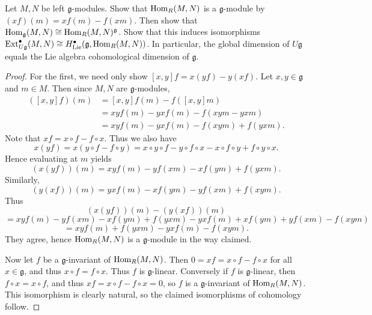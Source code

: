 \begin{exercise}\label{7.3.7}
	Let $M,N$ be left $\mathfrak{g} $-modules. Show that $\operatorname{Hom}_R(M,N)$ is a $\mathfrak{g} $-module by $(xf)(m)=xf(m)-f(xm)$. Then show that $\operatorname{Hom}_\mathfrak{g}(M,N)\cong \operatorname{Hom} _R (M,N)^\mathfrak{g} $.  Show that this induces isomorphisms $\operatorname{Ext} ^{\bullet} _{U\mathfrak{g} } (M,N)\cong H^{\bullet} _{\mathrm{Lie} } (\mathfrak{g} ,\operatorname{Hom}_R(M,N))$. In particular, the global dimension of $U\mathfrak{g} $ equals the Lie algebra cohomological dimension of $\mathfrak{g} $.
\end{exercise}
\begin{proof}
	For the first, we need only show $[x,y]f=x(yf)-y(xf)$. Let $x,y\in \mathfrak{g} $ and $m\in M$. Then since $M,N$ are $\mathfrak{g} $-modules, 
	\begin{align*}
		([x,y]f)(m) &= [x,y]f(m) - f([x,y]m)\\
			    &=xyf(m) - yxf(m) - f(xym - yxm)\\
			    &=xyf(m) - yxf(m) - f(xym) + f(yxm)
	.\end{align*}
	Note that $xf = x\circ f-f\circ x$. Thus we also have
	\[
		x(yf) = x(y\circ f - f\circ y) = x\circ y\circ f - y\circ f\circ x - x \circ f\circ y + f\circ y\circ x
	.\]
	Hence evaluating at $m$ yields
	\[
		(x(yf))(m) = xyf(m) - yf(xm) - xf(ym) + f(yxm)
	.\]
	Similarly,
	\[
		(y(xf))(m) = yxf(m) - xf(ym) - yf(xm) + f(xym)
	.\]
	Thus
	\[
	(x(yf))(m) - (y(xf))(m) \]
	\[
		= xyf(m) - yf(xm) - xf(ym) + f(yxm) - yxf(m) + xf(ym) + yf(xm) - f(xym)
	\]
	\[
		=xyf(m)+f(yxm) - yxf(m) - f(xym)
	.\]
	They agree, hence $\operatorname{Hom}_R(M,N)$ is a $\mathfrak{g} $-module in the way claimed. 

	Now let $f$ be a $\mathfrak{g} $-invariant of $\operatorname{Hom}_R(M,N)$. Then $0=xf = x\circ f - f\circ x$ for all $x\in \mathfrak{g} $, and thus $x\circ f = f\circ x$. Thus $f$ is $\mathfrak{g} $-linear. Conversely if $f$ is $\mathfrak{g} $-linear, then $f\circ x = x\circ f$, and thus $xf = x\circ f-f\circ x =0$, so $f$ is a $\mathfrak{g} $-invariant of $\operatorname{Hom}_R(M,N)$. This isomorphism is clearly natural, so the claimed isomorphisms of cohomology follow.
\end{proof}

